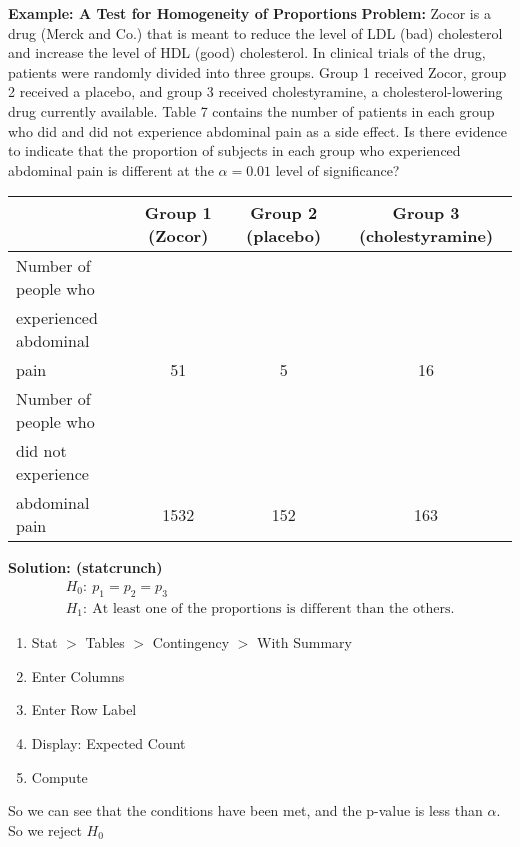 \documentclass{report}
\begin{document}
        \pagebreak \bigbreak \noindent 
        \begin{mdframed}
          \textbf{Example:  A Test for Homogeneity of Proportions}
          \bigbreak \noindent 
          \textbf{Problem:}
          Zocor is a drug (Merck and Co.) that is meant to reduce the level of LDL (bad) cholesterol and increase the level of HDL (good) cholesterol. In clinical trials of the drug, patients were randomly divided into three groups. Group 1 received Zocor, group 2 received a placebo, and group 3 received cholestyramine, a cholesterol-lowering drug currently available. Table 7 contains the number of patients in each group who did and did not experience abdominal pain as a side effect. Is there evidence to indicate that the proportion of subjects in each group who experienced abdominal pain is different at the $\alpha = 0.01 $ level of significance?
          \bigbreak \noindent 
          \begin{center}
           \begin{tabular}{lccc}
            & \textbf{Group 1 (Zocor)} & \textbf{Group 2 (placebo)} & \textbf{Group 3 (cholestyramine)} \\
            \hline
            Number of people who  \\ experienced abdominal  \\ pain & 51 & 5 & 16 \\
            \hline
            Number of people who \\ did not experience  \\ abdominal pain & 1532 & 152 & 163 \\
            \hline
            \end{tabular}
          \end{center}
          \bigbreak \noindent 
          \textbf{Solution: (statcrunch)}
          \bigbreak \noindent 
          \begin{align*}
              H_{0}:\ p_{1} = p_{2} = p_{3} \\
              H_{1}:\ \text{At least one of the proportions is different than the others}
          .\end{align*}
          \begin{enumerate}
              \item Stat $> $ Tables $>$ Contingency $>$ With Summary
                \item Enter Columns
                \item Enter Row Label
                \item Display: Expected Count
                \item Compute
          \end{enumerate}
          \bigbreak \noindent 
          So we can see that the conditions have been met, and the p-value is less than $\alpha$. So we reject $H_{0}$
        \end{mdframed}
\end{document}
